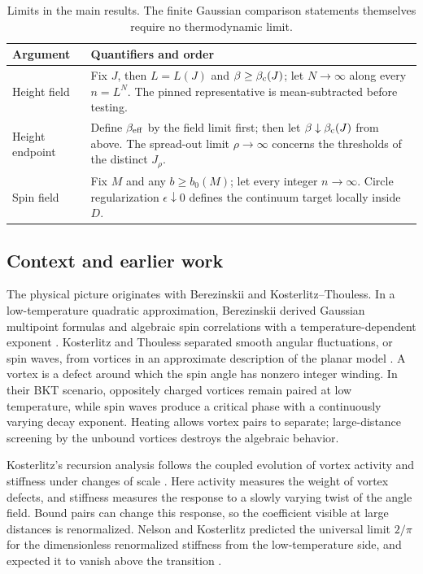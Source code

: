 \begin{table}[htbp]
\centering\small
\begin{tabular}{@{}p{}p{}@{}}
\toprule
Argument & Quantifiers and order \\
\midrule
Height field & Fix $J$, then $L=L(J)$ and $\beta\ge\beta_{\mathrm c}(J)$;
let $N\to\infty$ along every $n=L^N$.  The pinned representative is
mean-subtracted before testing. \\[3pt]
Height endpoint & Define $\beta_{\mathrm{eff}}$ by the field limit first;
then let $\beta\downarrow\beta_{\mathrm c}(J)$ from above.  The spread-out
limit $\rho\to\infty$ concerns the thresholds of the distinct $J_\rho$. \\[3pt]
Spin field & Fix $M$ and any $b\ge b_0(M)$; let every integer
$n\to\infty$.  Circle regularization $\epsilon\downarrow0$ defines
the continuum target locally inside $D$. \\
\bottomrule
\end{tabular}
\caption{Limits in the main results.  The finite Gaussian comparison
statements themselves require no thermodynamic limit.}
\label{main:limit-order}
\end{table}

\subsection{Context and earlier work}

The physical picture originates with Berezinskii and
Kosterlitz--Thouless.  In a low-temperature quadratic approximation,
Berezinskii derived Gaussian multipoint formulas and algebraic spin
correlations with a temperature-dependent exponent
\citep{Berezinskii1971}.  Kosterlitz and Thouless separated smooth angular
fluctuations, or spin waves, from vortices in an approximate description
of the planar model \citep{KosterlitzThouless1973}.  A vortex is a defect
around which the spin angle has nonzero integer winding.  In their BKT
scenario, oppositely charged vortices remain paired at low temperature,
while spin waves produce a critical phase with a continuously varying
decay exponent.  Heating allows vortex pairs to separate; large-distance
screening by the unbound vortices destroys the algebraic behavior.

Kosterlitz's recursion analysis follows the coupled evolution of vortex
activity and stiffness under changes of scale \citep{Kosterlitz1974}.
Here activity measures the weight of vortex defects, and stiffness
measures the response to a slowly varying twist of the angle field.
Bound pairs can change this response, so the coefficient visible at
large distances is renormalized.  Nelson and Kosterlitz predicted the
universal limit $2/\pi$ for the dimensionless renormalized stiffness
from the low-temperature side, and expected it to vanish above the
transition \citep{NelsonKosterlitz1977}.

